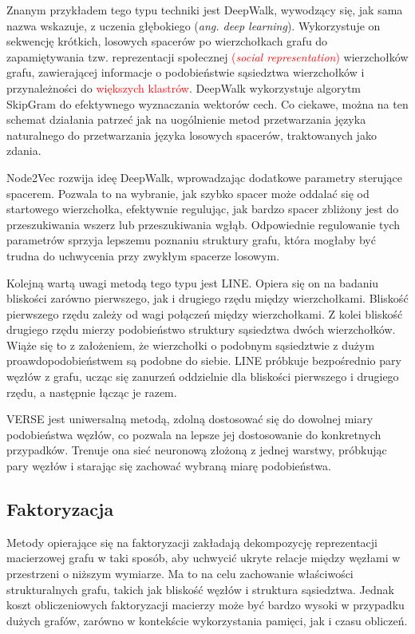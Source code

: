         Znanym przykładem tego typu techniki jest DeepWalk\cite{Perozzi_Al-Rfou_Skiena_2014}, wywodzący się, jak sama nazwa wskazuje, z uczenia głębokiego (\emph{ang. deep learning}). Wykorzystuje on sekwencję krótkich, losowych spacerów po wierzchołkach grafu do zapamiętywania tzw. reprezentacji społecznej \textcolor{red}{(\emph{social representation})} wierzchołków grafu, zawierającej informacje o podobieństwie sąsiedztwa wierzchołków i przynależności do \textcolor{red}{większych klastrów}. DeepWalk wykorzystuje algorytm SkipGram\cite{mikolov2013efficient} do efektywnego wyznaczania wektorów cech. Co ciekawe, można na ten schemat działania patrzeć jak na uogólnienie metod przetwarzania języka naturalnego do przetwarzania języka losowych spacerów, traktowanych jako zdania.
        
        Node2Vec\cite{Grover_Leskovec_2016} rozwija ideę DeepWalk, wprowadzając dodatkowe parametry sterujące spacerem. Pozwala to na wybranie, jak szybko spacer może oddalać się od startowego wierzchołka, efektywnie regulując, jak bardzo spacer zbliżony jest do przeszukiwania wszerz lub przeszukiwania wgłąb. Odpowiednie regulowanie tych parametrów sprzyja lepszemu poznaniu struktury grafu, która mogłaby być trudna do uchwycenia przy zwykłym spacerze losowym. 
        
        Kolejną wartą uwagi metodą tego typu jest LINE\cite{Tang_Qu_Wang_Zhang_Yan_Mei_2015}. Opiera się on na badaniu bliskości zarówno pierwszego, jak i drugiego rzędu między wierzchołkami. Bliskość pierwszego rzędu zależy od wagi połączeń między wierzchołkami. Z kolei bliskość drugiego rzędu mierzy podobieństwo struktury sąsiedztwa dwóch wierzchołków. Wiąże się to z założeniem, że wierzchołki o podobnym sąsiedztwie z dużym proawdopodobieństwem są podobne do siebie. LINE próbkuje bezpośrednio pary węzłów z grafu, ucząc się zanurzeń oddzielnie dla bliskości pierwszego i drugiego rzędu, a następnie łącząc je razem. 
        
        VERSE\cite{Tsitsulin_Mottin_Karras_Müller_2018} jest uniwersalną metodą, zdolną dostosować się do dowolnej miary podobieństwa węzłów, co pozwala na lepsze jej dostosowanie do konkretnych przypadków. Trenuje ona sieć neuronową złożoną z jednej warstwy, próbkując pary węzłów i starając się zachować wybraną miarę podobieństwa.

    \subsection{Faktoryzacja}
        Metody opierające się na faktoryzacji zakładają dekompozycję reprezentacji macierzowej grafu w taki sposób, aby uchwycić ukryte relacje między węzłami w przestrzeni o niższym wymiarze. Ma to na celu zachowanie właściwości strukturalnych grafu, takich jak bliskość węzłów i struktura sąsiedztwa. Jednak koszt obliczeniowych faktoryzacji macierzy może być bardzo wysoki w przypadku dużych grafów, zarówno w kontekście wykorzystania pamięci, jak i czasu obliczeń.

